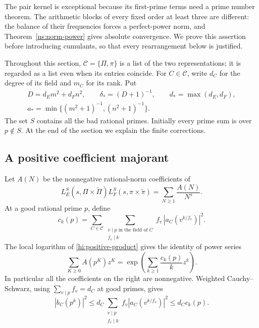 \documentclass[11pt,reqno]{amsart}
\numberwithin{equation}{section}
\theoremstyle{definition}
\theoremstyle{remark}
\begin{document}
The pair kernel is exceptional because its first-prime terms need a prime
number theorem.  The arithmetic blocks of every fixed order at least three
are different: the balance of their frequencies forces a perfect-power norm,
and Theorem~\ref{ns:norm-power} gives absolute convergence.  We prove this
assertion before introducing cumulants, so that every rearrangement below is
justified.

Throughout this section, $\mathcal C=\{\Pi,\pi\}$ is a list of the two
representations; it is regarded as a list even when its entries coincide.
For $C\in\mathcal C$, write $d_C$ for the degree of its field and $m_C$ for
its rank.  Put
\begin{equation}\label{hi:parameters}
 \begin{gathered}
 D=d_Em^2+d_Fn^2,\qquad \delta_*=(D+1)^{-1},\qquad
 d_* =\max(d_E,d_F),\\
 a_* =\min\{(m^2+1)^{-1},(n^2+1)^{-1}\}.
 \end{gathered}
\end{equation}
The set $S$ contains all the bad rational primes.  Initially every prime sum
is over $p\notin S$.  At the end of the section we explain the finite
corrections.

\subsection{A positive coefficient majorant}

Let $A(N)$ be the nonnegative rational-norm coefficients of
\begin{equation}\label{hi:positive-product}
 L_E^S(s,\Pi\times\widetilde\Pi)
 L_F^S(s,\pi\times\widetilde\pi)
 =\sum_{N\geq1}\frac{A(N)}{N^s}.
\end{equation}
At a good rational prime $p$, define
\begin{equation}\label{hi:ck}
 c_k(p)=\sum_{C\in\mathcal C}
 \sum_{\substack{v\mid p\text{ in the field of }C\\f_v\mid k}}
 f_v\,|a_C(v^{k/f_v})|^2.
\end{equation}
The local logarithm of \eqref{hi:positive-product} gives the identity of
power series
\begin{equation}\label{hi:exp-majorant}
 \sum_{K\geq0}A(p^K)z^K
 =\exp\left(\sum_{k\geq1}\frac{c_k(p)}{k}z^k\right).
\end{equation}
In particular all the coefficients on the right are nonnegative.  Weighted
Cauchy--Schwarz, using $\sum_{v\mid p}f_v=d_C$ at good primes, gives
\begin{equation}\label{hi:b-majorant}
 |b_C(p^k)|^2
 \leq d_C\sum_{\substack{v\mid p\\f_v\mid k}}
 f_v|a_C(v^{k/f_v})|^2
 \leq d_Cc_k(p).
\end{equation}
\end{document}
